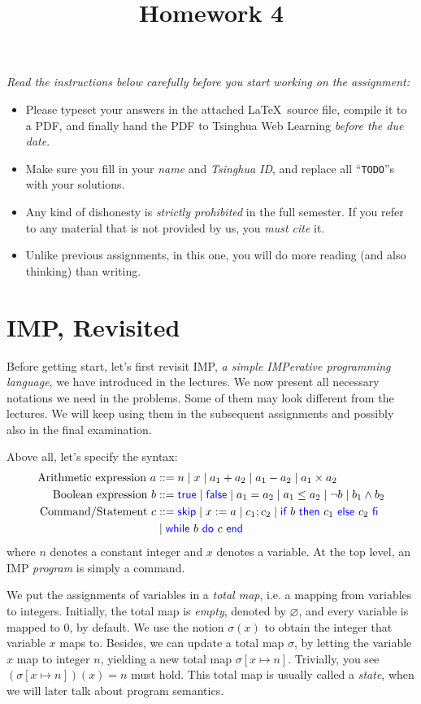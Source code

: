 \documentclass[11pt,a4paper]{article}
\title{Homework 4}
\let\emptyset\varnothing
\newcommand{\kword}[1]{{\color{blue} \textsf{#1}}}
\newcommand{\True}{\kword{true}}
\newcommand{\False}{\kword{false}}
\newcommand{\Skip}{\kword{skip}}
\newcommand{\If}{\kword{if}}
\newcommand{\Then}{\kword{then}}
\newcommand{\Else}{\kword{else}}
\newcommand{\Fi}{\kword{fi}}
\newcommand{\While}{\kword{while}}
\newcommand{\Do}{\kword{do}}
\newcommand{\End}{\kword{end}}
\begin{document}
\maketitle

\textit{Read the instructions below carefully before you start working on the assignment:}
\begin{itemize}
    \item Please typeset your answers in the attached \LaTeX~source file, compile it to a PDF,
    and finally hand the PDF to Tsinghua Web Learning \emph{before the due date}.
    \item Make sure you fill in your \emph{name} and \emph{Tsinghua ID},
    and replace all ``\texttt{TODO}''s with your solutions.
    \item Any kind of dishonesty is \emph{strictly prohibited} in the full semester.
    If you refer to any material that is not provided by us, you \emph{must cite} it.
    \item Unlike previous assignments, in this one, you will do more reading (and also thinking) than writing.
\end{itemize}

\section*{IMP, Revisited}
Before getting start, let's first revisit IMP, \emph{a simple IMPerative programming language}, we have introduced in the lectures. We now present all necessary notations we need in the problems.
Some of them may look different from the lectures.
We will keep using them in the subsequent assignments and possibly also in the final examination.

Above all, let's specify the syntax:
\begin{align*}
	\text{Arithmetic expression}~a &::= n \mid x \mid a_1 + a_2 \mid a_1 - a_2 \mid a_1 \times a_2 \\
	\text{Boolean expression}~b &::= \True \mid \False \mid a_1 = a_2 \mid a_1 \le a_2 \mid \neg b \mid b_1 \land b_2 \\
	\text{Command/Statement}~c &::= \Skip \mid x:=a \mid c_1;c_2 \mid \If~b~\Then~c_1~\Else~c_2~\Fi \\
	&\mid \While~b~\Do~c~\End
\end{align*}
where $n$ denotes a constant integer and $x$ denotes a variable.
At the top level, an IMP \emph{program} is simply a command.

We put the assignments of variables in a \emph{total map}, i.e. a mapping from variables to integers.
Initially, the total map is \emph{empty}, denoted by $\emptyset$, and every variable is mapped to 0, by default.
We use the notion $\sigma(x)$ to obtain the integer that variable $x$ maps to.
Besides, we can update a total map $\sigma$, by letting the variable $x$ map to integer $n$, yielding a new total map $\sigma[x \mapsto n]$.
Trivially, you see $(\sigma[x \mapsto n])(x) = n$ must hold.
This total map is usually called a \emph{state}, when we will later talk about program semantics.
\end{document}
